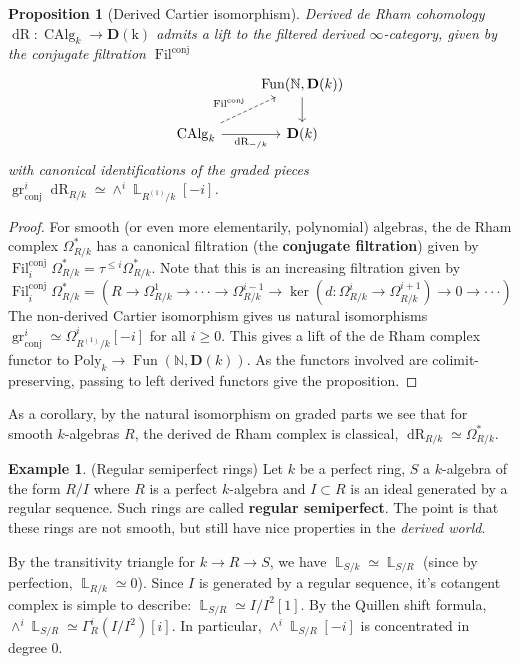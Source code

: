 \documentclass[12pt]{amsproc}
\newtheorem*{prop}{Proposition}
\theoremstyle{definition}
\newtheorem*{example}{Example}
\newcommand{\N}{\mathbb{N}}
\newcommand{\htpyeq}{\simeq}
\newcommand{\ra}{\rightarrow}
\DeclareMathOperator{\Fil}{Fil}
\DeclareMathOperator{\gr}{gr}
\DeclareMathOperator{\Fun}{Fun}
\DeclareMathOperator{\DerivedL}{\mathbb{L}}
\DeclareMathOperator{\dR}{dR}
\newcommand{\ddd}{\cdot\cdot\cdot}
\begin{document}
\begin{prop}[Derived Cartier isomorphism] Derived de Rham cohomology $\dR:\operatorname{CAlg}_k\ra\operatorname{\mathbf{D}(k)}$ admits a lift to the filtered derived $\infty$-category, given by the conjugate filtration $\Fil^{\text{conj}}$
\[\begin{tikzcd}
& \Fun(\N,\mathbf{D}(k))\arrow[d]\\
\operatorname{CAlg}_k\arrow[r,"\dR_{-/k}"']\arrow[ur, "\Fil^{\operatorname{conj}}", dashed]& \mathbf{D}(k)
\end{tikzcd}\]
with canonical identifications of the graded pieces $\gr^i_{\operatorname{conj}}\dR_{R/k}\htpyeq \wedge^i\DerivedL_{R^{(1)}/k}[-i]$.
\end{prop}
\begin{proof}
For smooth (or even more elementarily, polynomial) algebras, the de Rham complex $\Omega^*_{R/k}$ has a canonical filtration (the \textbf{conjugate filtration}) given by $\Fil^{\text{conj}}_i\Omega^*_{R/k}=\tau^{\le i}\Omega^*_{R/k}$. Note that this is an increasing filtration given by
\[	\Fil^{\text{conj}}_i\Omega^*_{R/k} = (R\ra \Omega^1_{R/k}\ra\ddd\ra \Omega^{i-1}_{R/k}\ra\ker(d:\Omega^i_{R/k}\ra\Omega^{i+1}_{R/k})\ra 0 \ra\ddd)	\]
The non-derived Cartier isomorphism gives us natural isomorphisms $\gr^i_{\operatorname{conj}}\htpyeq \Omega^i_{R^{(1)}/k}[-i]$ for all $i\ge 0$. This gives a lift of the de Rham complex functor to $\text{Poly}_k\ra \Fun(\N,\textbf{D}(k))$. As the functors involved are colimit-preserving, passing to left derived functors give the proposition.
\end{proof}

As a corollary, by the natural isomorphism on graded parts we see that for smooth $k$-algebras $R$, the derived de Rham complex is classical, $\dR_{R/k}\htpyeq \Omega^*_{R/k}$.

\begin{example}(Regular semiperfect rings) Let $k$ be a perfect ring, $S$ a $k$-algebra of the form $R/I$ where $R$ is a perfect $k$-algebra and $I\subset R$ is an ideal generated by a regular sequence. Such rings are called \textbf{regular semiperfect}. The point is that these rings are not smooth, but still have nice properties in the \textit{derived world}.

By the transitivity triangle for $k\ra R\ra S$, we have $\DerivedL_{S/k}\htpyeq\DerivedL_{S/R}$ (since by perfection, $\DerivedL_{R/k}\htpyeq 0$). Since $I$ is generated by a regular sequence, it's cotangent complex is simple to describe: $\DerivedL_{S/R}\htpyeq I/I^2[1]$. By the Quillen shift formula, $\wedge^i\DerivedL_{S/R}\htpyeq\Gamma^i_R(I/I^2)[i]$. In particular, $\wedge^i\DerivedL_{S/R}[-i]$ is concentrated in degree 0.
\end{example}
\end{document}
